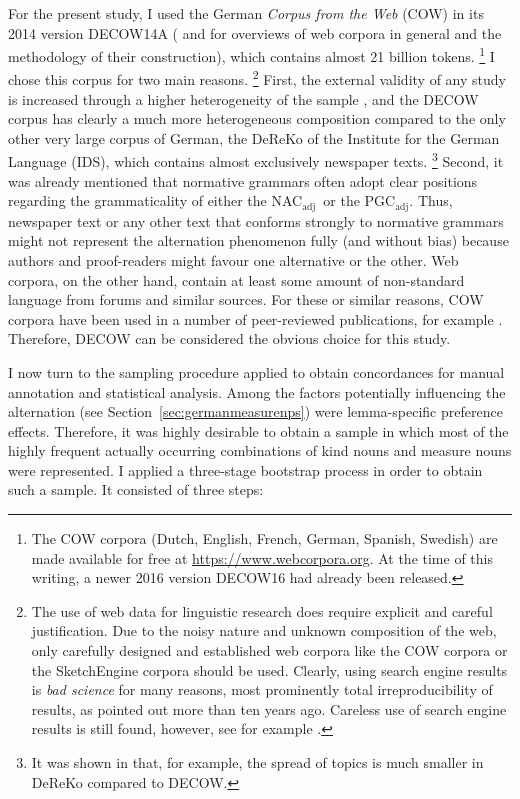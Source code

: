 \documentclass[USenglish]{article}
\newcommand{\Sub}[1]{\ensuremath{\mathrm{_{#1}}}}
\newcommand{\NACa}{NAC\Sub{adj}}
\newcommand{\PGCa}{PGC\Sub{adj}}
\begin{document}
For the present study, I used the German \textit{Corpus from the Web} (COW) in its 2014 version DECOW14A (\citealp{SchaeferBildhauer2012full,Schaefer2015b} and \citealp{BiemannEa2013,SchaeferBildhauer2013} for overviews of web corpora in general and the methodology of their construction), which contains almost 21 billion tokens.%
\footnote{The COW corpora (Dutch, English, French, German, Spanish, Swedish) are made available for free at \url{https://www.webcorpora.org}.
At the time of this writing, a newer 2016 version DECOW16 had already been released.}
I chose this corpus for two main reasons.%
\footnote{The use of web data for linguistic research does require explicit and careful justification.
Due to the noisy nature and unknown composition of the web, only carefully designed and established web corpora like the COW corpora or the SketchEngine corpora \citep{KilgarriffEa2014} should be used.
Clearly, using search engine results is \textit{bad science} for many reasons, most prominently total irreproducibility of results, as \cite{Kilgarriff2006} pointed out more than ten years ago.
Careless use of search engine results is still found, however, see for example \citet[171--175]{DeclerckBrems2016}.}
First, the external validity of any study is increased through a higher heterogeneity of the sample \citep[30]{MaxwellDelaney2004}, and the DECOW corpus has clearly a much more heterogeneous composition compared to the only other very large corpus of German, the DeReKo \citep{KupietzEa2010} of the Institute for the German Language (IDS), which contains almost exclusively newspaper texts.%
\footnote{It was shown in \cite{W16-2601} that, for example, the spread of topics is much smaller in DeReKo compared to DECOW.}
Second, it was already mentioned that normative grammars often adopt clear positions regarding the grammaticality of either the \NACa\ or the \PGCa.
Thus, newspaper text or any other text that conforms strongly to normative grammars might not represent the alternation phenomenon fully (and without bias) because authors and proof-readers might favour one alternative or the other.
Web corpora, on the other hand, contain at least some amount of non-standard language from forums and similar sources.
For these or similar reasons, COW corpora have been used in a number of peer-reviewed publications, for example \cite{VanGoethemHiligsmann2014,VanGoethemHuening2015,MuellerS2014,Schaefer2016c,SchaeferSayatz2014,SchaeferSayatz2016,Zimmer2015}. 
Therefore, DECOW can be considered the obvious choice for this study.

I now turn to the sampling procedure applied to obtain concordances for manual annotation and statistical analysis.
Among the factors potentially influencing the alternation (see Section~\ref{sec:germanmeasurenps}) were lemma-specific preference effects.
Therefore, it was highly desirable to obtain a sample in which most of the highly frequent actually occurring combinations of kind nouns and measure nouns were represented.
I applied a three-stage bootstrap process in order to obtain such a sample.
It consisted of three steps:
\end{document}
